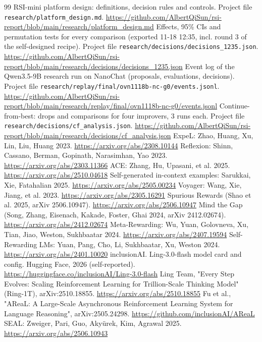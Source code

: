 \begin{thebibliography}{99}
 RSI-mini platform design: definitions, decision rules and controls. Project file \texttt{research/platform\_design.md}. \url{https://github.com/AlbertQiSun/rsi-report/blob/main/research/platform_design.md}
 Effects, 95\% CIs and permutation tests for every comparison (exported 11-18 12:35, incl. round 3 of the self-designed recipe). Project file \texttt{research/decisions/decisions\_1235.json}. \url{https://github.com/AlbertQiSun/rsi-report/blob/main/research/decisions/decisions_1235.json}
 Event log of the Qwen3.5-9B research run on NanoChat (proposals, evaluations, decisions). Project file \texttt{research/replay/final/ovn1118b-nc-g0/events.jsonl}. \url{https://github.com/AlbertQiSun/rsi-report/blob/main/research/replay/final/ovn1118b-nc-g0/events.jsonl}
 Continue-from-best: drops and comparisons for four improvers, 3 runs each. Project file \texttt{research/decisions/cf\_analysis.json}. \url{https://github.com/AlbertQiSun/rsi-report/blob/main/research/decisions/cf_analysis.json}
 ExpeL: Zhao, Huang, Xu, Lin, Liu, Huang 2023. \url{https://arxiv.org/abs/2308.10144}
 Reflexion: Shinn, Cassano, Berman, Gopinath, Narasimhan, Yao 2023. \url{https://arxiv.org/abs/2303.11366}
 ACE: Zhang, Hu, Upasani, et al. 2025. \url{https://arxiv.org/abs/2510.04618}
 Self-generated in-context examples: Sarukkai, Xie, Fatahalian 2025. \url{https://arxiv.org/abs/2505.00234}
 Voyager: Wang, Xie, Jiang, et al. 2023. \url{https://arxiv.org/abs/2305.16291}
 Spurious Rewards (Shao et al. 2025, arXiv 2506.10947). \url{https://arxiv.org/abs/2506.10947}
 Mind the Gap (Song, Zhang, Eisenach, Kakade, Foster, Ghai 2024, arXiv 2412.02674). \url{https://arxiv.org/abs/2412.02674}
 Meta-Rewarding: Wu, Yuan, Golovneva, Xu, Tian, Jiao, Weston, Sukhbaatar 2024. \url{https://arxiv.org/abs/2407.19594}
 Self-Rewarding LMs: Yuan, Pang, Cho, Li, Sukhbaatar, Xu, Weston 2024. \url{https://arxiv.org/abs/2401.10020}
 inclusionAI. Ling-3.0-flash model card and config. Hugging Face, 2026 (self-reported). \url{https://huggingface.co/inclusionAI/Ling-3.0-flash}
 Ling Team, "Every Step Evolves: Scaling Reinforcement Learning for Trillion-Scale Thinking Model" (Ring-1T), arXiv:2510.18855. \url{https://arxiv.org/abs/2510.18855}
 Fu et al., "AReaL: A Large-Scale Asynchronous Reinforcement Learning System for Language Reasoning", arXiv:2505.24298. \url{https://github.com/inclusionAI/AReaL}
 SEAL: Zweiger, Pari, Guo, Akyürek, Kim, Agrawal 2025. \url{https://arxiv.org/abs/2506.10943}
\end{thebibliography}
